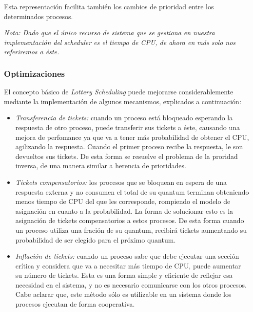 Esta representaci\'on facilita tambi\'en los cambios de prioridad entre los determinados procesos.

\textit{Nota: Dado que el \'unico recurso de sistema que se gestiona en nuestra implementaci\'on del scheduler es el tiempo de CPU, de ahora en m\'as solo nos referiremos a \'este.}

\subsubsection{Optimizaciones}

El concepto b\'asico de \textit{Lottery Scheduling} puede mejorarse considerablemente mediante la implementaci\'on de algunos mecanismos, explicados a continuaci\'on:

\begin{itemize}

\item \textit{Transferencia de tickets:} cuando un proceso est\'a bloqueado esperando la respuesta de otro proceso, puede transferir sus tickets a \'este, causando una mejora de perfomance ya que va a tener m\'as probabilidad de obtener el CPU, agilizando la respuesta. Cuando el primer proceso recibe la respuesta, le son devueltos sus tickets. De esta forma se resuelve el problema de la proridad inversa, de una manera similar a herencia de prioridades.

\item \textit{Tickets compensatorios:} los procesos que se bloquean en espera de una respuesta externa y no consumen el total de su quantum terminan obteniendo menos tiempo de CPU del que les corresponde, rompiendo el modelo de asignaci\'on en cuanto a la probabilidad. La forma de solucionar esto es la asignaci\'on de tickets compensatorios a estos procesos. De esta forma cuando un proceso utiliza una fraci\'on de su quantum, recibir\'a tickets aumentando su probabilidad de ser elegido para el pr\'oximo quantum.

\item \textit{Inflaci\'on de tickets:} cuando un proceso sabe que debe ejecutar una secci\'on cr\'itica y considera que va a necesitar m\'as tiempo de CPU, puede aumentar su n\'umero de tickets. Esta es una forma simple y eficiente de reflejar esa necesidad en el sistema, y no es necesario comunicarse con los otros procesos. Cabe aclarar que, este m\'etodo s\'olo es utilizable en un sistema donde los procesos ejecutan de forma cooperativa. 

\end{itemize}

